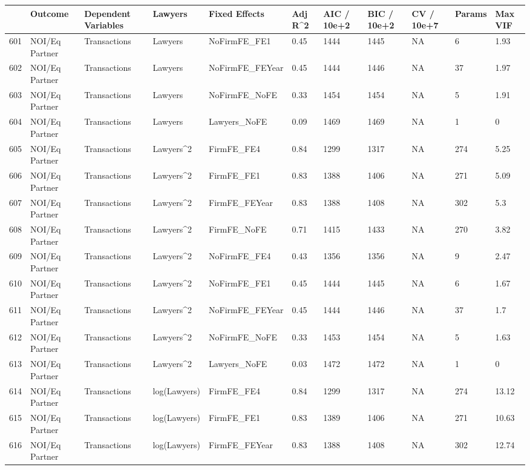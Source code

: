 \documentclass{article}
\begin{document}
\begin{table}[H]
\centering
\begin{tabular}{rllllllllll}
  \hline
 & Outcome & Dependent Variables & Lawyers & Fixed Effects & Adj R^2 & AIC / 10e+2 & BIC / 10e+2 & CV / 10e+7 & Params & Max VIF \\ 
  \hline
601 & NOI/Eq Partner & Transactions & Lawyers & NoFirmFE\_FE1 & 0.45 & 1444 & 1445 & NA & 6 & 1.93 \\ 
  602 & NOI/Eq Partner & Transactions & Lawyers & NoFirmFE\_FEYear & 0.45 & 1444 & 1446 & NA & 37 & 1.97 \\ 
  603 & NOI/Eq Partner & Transactions & Lawyers & NoFirmFE\_NoFE & 0.33 & 1454 & 1454 & NA & 5 & 1.91 \\ 
  604 & NOI/Eq Partner & Transactions & Lawyers & Lawyers\_NoFE & 0.09 & 1469 & 1469 & NA & 1 & 0 \\ 
  605 & NOI/Eq Partner & Transactions & Lawyers^2 & FirmFE\_FE4 & 0.84 & 1299 & 1317 & NA & 274 & 5.25 \\ 
  606 & NOI/Eq Partner & Transactions & Lawyers^2 & FirmFE\_FE1 & 0.83 & 1388 & 1406 & NA & 271 & 5.09 \\ 
  607 & NOI/Eq Partner & Transactions & Lawyers^2 & FirmFE\_FEYear & 0.83 & 1388 & 1408 & NA & 302 & 5.3 \\ 
  608 & NOI/Eq Partner & Transactions & Lawyers^2 & FirmFE\_NoFE & 0.71 & 1415 & 1433 & NA & 270 & 3.82 \\ 
  609 & NOI/Eq Partner & Transactions & Lawyers^2 & NoFirmFE\_FE4 & 0.43 & 1356 & 1356 & NA & 9 & 2.47 \\ 
  610 & NOI/Eq Partner & Transactions & Lawyers^2 & NoFirmFE\_FE1 & 0.45 & 1444 & 1445 & NA & 6 & 1.67 \\ 
  611 & NOI/Eq Partner & Transactions & Lawyers^2 & NoFirmFE\_FEYear & 0.45 & 1444 & 1446 & NA & 37 & 1.7 \\ 
  612 & NOI/Eq Partner & Transactions & Lawyers^2 & NoFirmFE\_NoFE & 0.33 & 1453 & 1454 & NA & 5 & 1.63 \\ 
  613 & NOI/Eq Partner & Transactions & Lawyers^2 & Lawyers\_NoFE & 0.03 & 1472 & 1472 & NA & 1 & 0 \\ 
  614 & NOI/Eq Partner & Transactions & log(Lawyers) & FirmFE\_FE4 & 0.84 & 1299 & 1317 & NA & 274 & 13.12 \\ 
  615 & NOI/Eq Partner & Transactions & log(Lawyers) & FirmFE\_FE1 & 0.83 & 1389 & 1406 & NA & 271 & 10.63 \\ 
  616 & NOI/Eq Partner & Transactions & log(Lawyers) & FirmFE\_FEYear & 0.83 & 1388 & 1408 & NA & 302 & 12.74 \\ 

\end{tabular}
\end{table}
\end{document}
